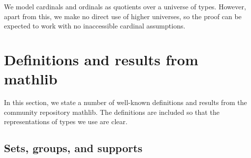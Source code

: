 \documentclass{article}
\theoremstyle{definition}
\theoremstyle{remark}
\begin{document}
We model cardinals and ordinals as quotients over a universe of types.
However, apart from this, we make no direct use of higher universes, so the proof can be expected to work with no inaccessible cardinal assumptions.

\section{Definitions and results from mathlib}

In this section, we state a number of well-known definitions and results from the community repository mathlib.
The definitions are included so that the representations of types we use are clear.

\subsection{Sets, groups, and supports}
\end{document}
